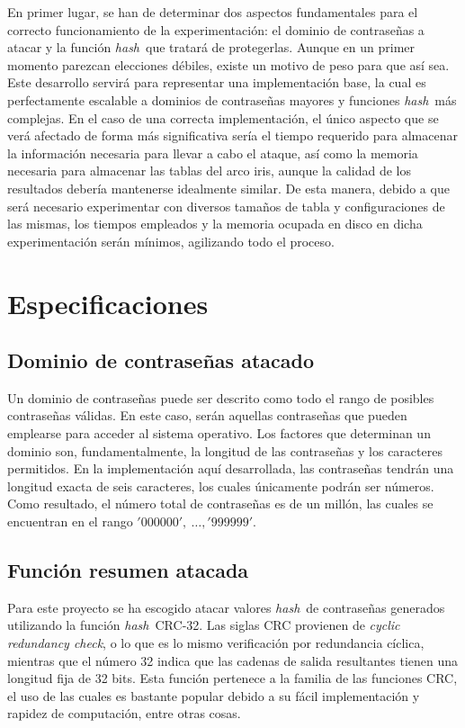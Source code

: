 \documentclass[12pt,spanish,listoffigures,listoftables,listofalgorithms]{tfgetsinf}
\newcommand{\hash}{\textit{hash}}
\begin{document}
En primer lugar, se han de determinar dos aspectos fundamentales para el correcto funcionamiento de la experimentación: el dominio de contraseñas a atacar y la función \hash~que tratará de protegerlas. Aunque en un primer momento parezcan elecciones débiles, existe un motivo de peso para que así sea. Este desarrollo servirá para representar una implementación base, la cual es perfectamente escalable a dominios de contraseñas mayores y funciones \hash~más complejas. En el caso de una correcta implementación, el único aspecto que se verá afectado de forma más significativa sería el tiempo requerido para almacenar la información necesaria para llevar a cabo el ataque, así como la memoria necesaria para almacenar las tablas del arco iris, aunque la calidad de los resultados debería mantenerse idealmente similar. De esta manera, debido a que será necesario experimentar con diversos tamaños de tabla y configuraciones de las mismas, los tiempos empleados y la memoria ocupada en disco en dicha experimentación serán mínimos, agilizando todo el proceso.

\section{Especificaciones}

\subsection{Dominio de contraseñas atacado}

Un dominio de contraseñas puede ser descrito como todo el rango de posibles contraseñas válidas. En este caso, serán aquellas contraseñas que pueden emplearse para acceder al sistema operativo. Los factores que determinan un dominio son, fundamentalmente, la longitud de las contraseñas y los caracteres permitidos. En la implementación aquí desarrollada, las contraseñas tendrán una longitud exacta de seis caracteres, los cuales únicamente podrán ser números. Como resultado, el número total de contraseñas es de un millón, las cuales se encuentran en el rango $'000000',~\dots, '999999'$.


\subsection{Función resumen atacada} \label{crc32}

Para este proyecto se ha escogido atacar valores \hash~de contraseñas generados utilizando la función \hash~CRC-32. Las siglas CRC provienen de \textit{cyclic redundancy check}, o lo que es lo mismo verificación por redundancia cíclica, mientras que el número 32 indica que las cadenas de salida resultantes tienen una longitud fija de 32 bits. Esta función pertenece a la familia de las funciones CRC, el uso de las cuales es bastante popular debido a su fácil implementación y rapidez de computación, entre otras cosas.
\end{document}
